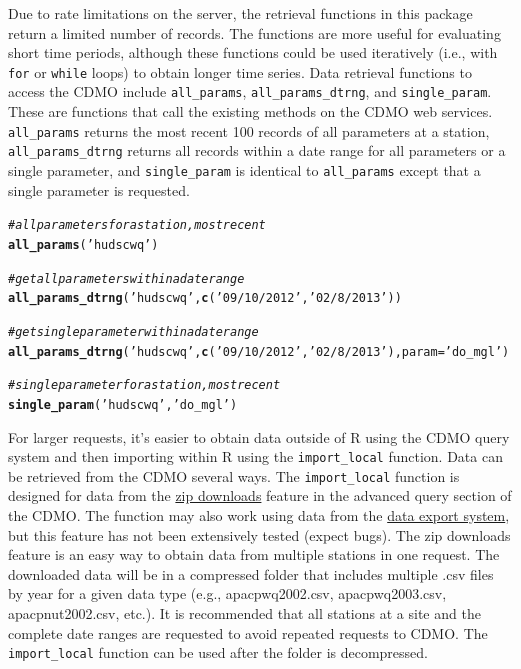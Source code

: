 \documentclass[10pt,letterpaper]{article}\usepackage[]{graphicx}\usepackage[]{color}
\makeatletter
\newcommand{\hlstr}[1]{\textcolor[rgb]{0.192,0.494,0.8}{#1}}%
\newcommand{\hlcom}[1]{\textcolor[rgb]{0.678,0.584,0.686}{\textit{#1}}}%
\newcommand{\hlstd}[1]{\textcolor[rgb]{0.345,0.345,0.345}{#1}}%
\newcommand{\hlkwc}[1]{\textcolor[rgb]{0.333,0.667,0.333}{#1}}%
\newcommand{\hlkwd}[1]{\textcolor[rgb]{0.737,0.353,0.396}{\textbf{#1}}}%
\newenvironment{kframe}{%
 \def\at@end@of@kframe{}%
 \ifinner\ifhmode%
  \def\at@end@of@kframe{\end{minipage}}%
  \begin{minipage}{\columnwidth}%
 \fi\fi%
 \def\FrameCommand##1{\hskip\@totalleftmargin \hskip-\fboxsep
 \colorbox{shadecolor}{##1}\hskip-\fboxsep
     \hskip-\linewidth \hskip-\@totalleftmargin \hskip\columnwidth}%
 \MakeFramed {\advance\hsize-\width
   \@totalleftmargin\z@ \linewidth\hsize
   \@setminipage}}%
 {\par\unskip\endMakeFramed%
 \at@end@of@kframe}
\newenvironment{knitrout}{}{} %
\makeatother
\begin{document}
Due to rate limitations on the server, the retrieval functions in this package return a limited number of records.  The functions are more useful for evaluating short time periods, although these functions could be used iteratively (i.e., with \texttt{for} or \texttt{while} loops) to obtain longer time series.  Data retrieval functions to access the CDMO include \texttt{all\_params}, \texttt{all\_params\_dtrng}, and \texttt{single\_param}.  These are functions that call the existing methods on the CDMO web services.  \texttt{all\_params} returns the most recent 100 records of all parameters at a station, \texttt{all\_params\_dtrng} returns all records within a date range for all parameters or a single parameter, and \texttt{single\_param} is identical to \texttt{all\_params} except that a single parameter is requested.    

\begin{knitrout}
\color{fgcolor}\begin{kframe}
\begin{alltt}
\hlcom{# all parameters for a station, most recent}
\hlkwd{all_params}\hlstd{(}\hlstr{'hudscwq'}\hlstd{)}

\hlcom{# get all parameters within a date range}
\hlkwd{all_params_dtrng}\hlstd{(}\hlstr{'hudscwq'}\hlstd{,} \hlkwd{c}\hlstd{(}\hlstr{'09/10/2012'}\hlstd{,} \hlstr{'02/8/2013'}\hlstd{))}

\hlcom{# get single parameter within a date range}
\hlkwd{all_params_dtrng}\hlstd{(}\hlstr{'hudscwq'}\hlstd{,} \hlkwd{c}\hlstd{(}\hlstr{'09/10/2012'}\hlstd{,} \hlstr{'02/8/2013'}\hlstd{),} \hlkwc{param} \hlstd{=} \hlstr{'do_mgl'}\hlstd{)}

\hlcom{# single parameter for a station, most recent}
\hlkwd{single_param}\hlstd{(}\hlstr{'hudscwq'}\hlstd{,} \hlstr{'do_mgl'}\hlstd{)}
\end{alltt}
\end{kframe}
\end{knitrout}

For larger requests, it's easier to obtain data outside of R using the CDMO query system and then importing within R using the \texttt{import\_local} function.  Data can be retrieved from the CDMO several ways.  The \texttt{import\_local} function is designed for data from the \href{http://cdmo.baruch.sc.edu/aqs/zips.cfm}{zip downloads} feature in the advanced query section of the CDMO. The function may also work using data from the \href{http://cdmo.baruch.sc.edu/get/export.cfm}{data export system}, but this feature has not been extensively tested (expect bugs).  The zip downloads feature is an easy way to obtain data from multiple stations in one request.  The downloaded data will be in a compressed folder that includes multiple .csv files by year for a given data type (e.g., apacpwq2002.csv, apacpwq2003.csv, apacpnut2002.csv, etc.).  It is recommended that all stations at a site and the complete date ranges are requested to avoid repeated requests to CDMO.  The \texttt{import\_local} function can be used after the folder is decompressed.
\end{document}
